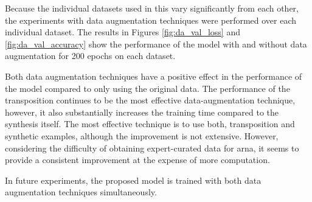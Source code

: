 
Because the individual datasets used in this \thesisdiss{}
vary significantly from each other, the experiments with
data augmentation techniques were performed over each
individual dataset. The results in Figures
\ref{fig:da_val_loss} and \ref{fig:da_val_accuracy} show the
performance of the model with and without data augmentation
for 200 epochs on each dataset. 




Both data augmentation techniques have a positive effect in
the performance of the model compared to only using the
original data. The performance of the transposition
continues to be the most effective data-augmentation
technique, however, it also substantially increases the
training time compared to the synthesis itself. The most
effective technique is to use both, transposition and
synthetic examples, although the improvement is not
extensive. However, considering the difficulty of obtaining
expert-curated data for \gls{arna}, it seems to provide a
consistent improvement at the expense of more computation.

In future experiments, the proposed model is trained with
both data augmentation techniques simultaneously.

